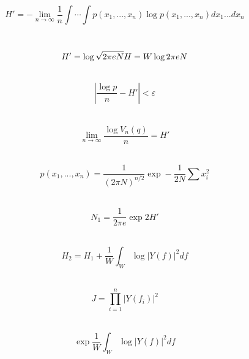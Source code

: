 \begin{equation}
{H}'=-\lim_{n\rightarrow \infty }\frac{1}{n}\int \cdots \int p\left ( x_{1},...,x_{n}\right ) \log p\left ( x_{1},...,x_{n}\right )dx_{1}...dx_{n}
\end{equation}

\\

\begin{equation}
{H}'=\log \sqrt{2\pi eN}
\newline
H=W\log 2\pi eN
\end{equation}

\\

\begin{equation}
\left | \frac{\log p}{n} - {H}'\right |< \varepsilon 
\end{equation}

\\

\begin{equation}
\lim_{n\rightarrow \infty }\frac{\log V_{n}\left ( q \right )}{n}={H}'
\end{equation}

\\

\begin{equation}
p\left ( x_{1},...,x_{n}\right )=\frac{1}{\left ( 2\pi N \right )^{n/2}}\exp -\frac{1}{2N}\sum x_{i}^{2}
\end{equation}

\\

\begin{equation}
N_{1}=\frac{1}{2\pi e}\exp 2{H}'
\end{equation}

\\

\begin{equation}
H_{2}=H_{1}+\frac{1}{W}\int_{W}^{\:}\log \left | Y\left ( f \right ) \right |^{2}df
\end{equation}

\\

\begin{equation}
J=\prod_{i=1}^{n}\left | Y\left ( f_{i} \right )  \right |^{2}
\end{equation}

\\

\begin{equation}
\exp \frac{1}{W}\int_{W}^{\:}\log \left | Y\left ( f \right ) \right |^{2}df
\end{equation}

\\

\begin{equation}

\end{equation}

\\


